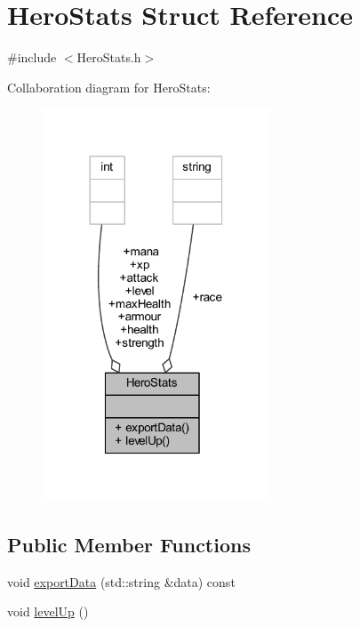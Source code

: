 \hypertarget{struct_hero_stats}{}\section{Hero\+Stats Struct Reference}
\label{struct_hero_stats}


{\ttfamily \#include $<$Hero\+Stats.\+h$>$}



Collaboration diagram for Hero\+Stats\+:\nopagebreak
\begin{figure}[H]
\begin{center}
\leavevmode
\includegraphics[width=192pt]{struct_hero_stats__coll__graph}
\end{center}
\end{figure}
\subsection*{Public Member Functions}
\begin{DoxyCompactItemize}
\item 
void \mbox{\hyperlink{struct_hero_stats_a9580a49eab11c0babd042b6e7e551e4e}{export\+Data}} (std\+::string \&data) const
\item 
void \mbox{\hyperlink{struct_hero_stats_af28870ab75d59129709abd0b84670a43}{level\+Up}} ()
\end{DoxyCompactItemize}
